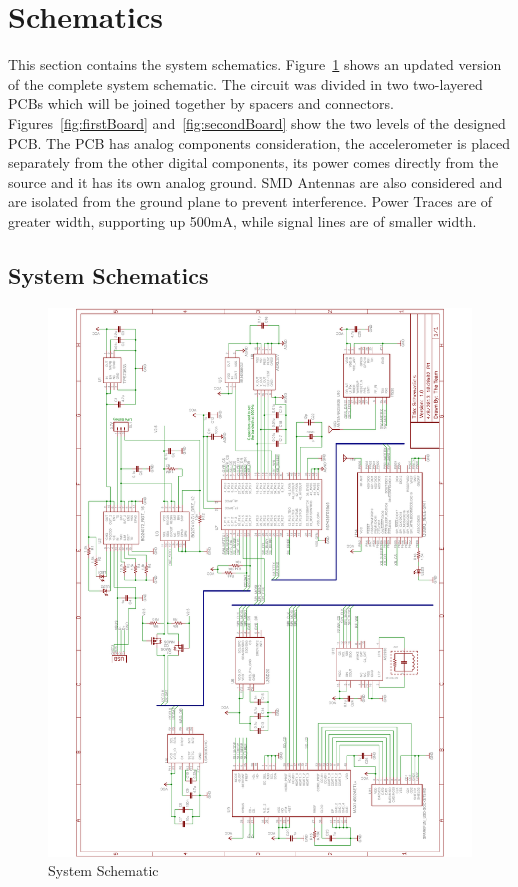 \section{Schematics}

This section contains the system schematics. Figure~\ref{fig:systemSchematics} shows an updated version of the complete system schematic.  The circuit was divided in two two-layered PCBs which will be joined together by spacers and connectors. Figures~\ref{fig:firstBoard} and~\ref{fig:secondBoard} show the two levels of the designed PCB. The PCB has analog components consideration, the accelerometer is placed separately from the other digital components, its power comes directly from the source and it has its own analog ground. SMD Antennas are also considered and are isolated from the ground plane to prevent interference. Power Traces are of greater width, supporting up 500mA, while signal lines are of smaller width. 
\subsection{System Schematics}
\begin{figure}[H]
\centering
	\includegraphics[width=\textwidth]{img/CompleteSchematics}
	\caption{System Schematic \label{fig:systemSchematics}}
\end{figure}

